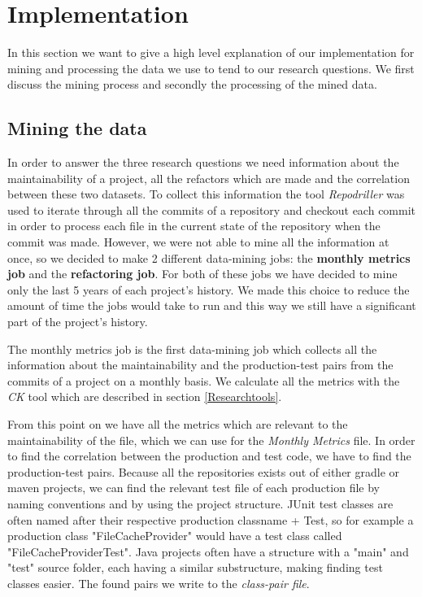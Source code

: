 \section{Implementation}
In this section we want to give a high level explanation of our implementation for mining and processing the data we use to tend to our research questions. We first discuss the mining process and secondly the processing of the mined data.
\subsection{Mining the data}
In order to answer the three research questions we need information about the maintainability of a project, all the refactors which are made and the correlation between these two datasets. To collect this information the tool \textit{Repodriller} was used to iterate through all the commits of a repository and checkout each commit in order to process each file in the current state of the repository when the commit was made. However, we were not able to mine all the information at once, so we decided to make 2 different data-mining jobs: the \textbf{monthly metrics job} and the \textbf{refactoring job}. For both of these jobs we have decided to mine only the last 5 years of each project's history. We made this choice to reduce the amount of time the jobs would take to run and this way we still have a significant part of the project's history.

The monthly metrics job is the first data-mining job which collects all the information about the maintainability and the production-test pairs from the commits of a project on a monthly basis. We calculate all the metrics with the \textit{CK} tool which are described in section \ref{Researchtools}. 

From this point on we have all the metrics which are relevant to the maintainability of the file, which we can use for the \textit{Monthly Metrics} file. In order to find the correlation between the production and test code, we have to find the production-test pairs. Because all the repositories exists out of either gradle or maven projects, we can find the relevant test file of each production file by naming conventions and by using the project structure. JUnit test classes are often named after their respective production classname + Test, so for example a production class "FileCacheProvider" would have a test class called "FileCacheProviderTest". Java projects often have a structure with a "main" and "test" source folder, each having a similar substructure, making finding test classes easier. The found pairs we write to the \textit{class-pair file}.

